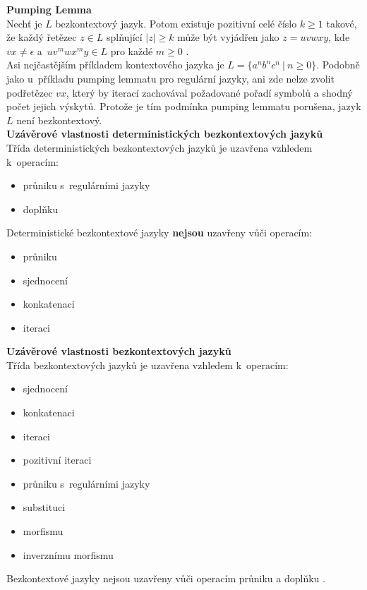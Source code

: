 \textbf{Pumping Lemma} \\
Nechť je $L$ bezkontextový jazyk. Potom existuje pozitivní celé číslo $k \geq 1$ takové, že každý \mbox{řetězec} 
$z \in L$ splňující $|z| \geq k$ může být vyjádřen jako $z = uvwxy$, kde $vx \neq \epsilon$ a~$uv^mwx^my \in L$ pro každé $m \geq 0$ \cite[str. 187]{Meduna2014}. \\

\Bat{} Asi nejčastějším příkladem kontextového jazyka je $L = \{a^nb^nc^n \ | \ n \geq 0\}$. Podobně jako u~příkladu pumping lemmatu pro regulární jazyky,
ani zde nelze zvolit podřetězec $vx$, který by iterací zachovával požadované pořadí symbolů a shodný počet jejich výskytů. Protože je tím podmínka pumping lemmatu
porušena, jazyk $L$ není bezkontextový. \\

\textbf{Uzávěrové vlastnosti deterministických bezkontextových jazyků} \\
Třída deterministických bezkontextových jazyků je uzavřena vzhledem k~operacím:
\begin{itemize}
\item průniku s~regulárními jazyky
\item doplňku \cite[str. 99]{TIN2013}
\end{itemize}
Deterministické bezkontextové jazyky \textbf{nejsou} uzavřeny vůči operacím:
\begin{itemize}
\item průniku
\item sjednocení
\item konkatenaci
\item iteraci \cite[str. 99]{TIN2013}
\end{itemize}
\vspace*{\baselineskip}

\textbf{Uzávěrové vlastnosti bezkontextových jazyků} \\
Třída bezkontextových jazyků je uzavřena vzhledem k~operacím:
\begin{itemize}
\item sjednocení
\item konkatenaci
\item iteraci
\item pozitivní iteraci
\item průniku s~regulárními jazyky
\item substituci
\item morfismu 
\item inverznímu morfismu \cite[str. 96-97]{TIN2013}
\end{itemize}
\vspace*{\baselineskip}
Bezkontextové jazyky nejsou uzavřeny vůči operacím průniku a doplňku \cite[str. 97]{TIN2013}. \\

